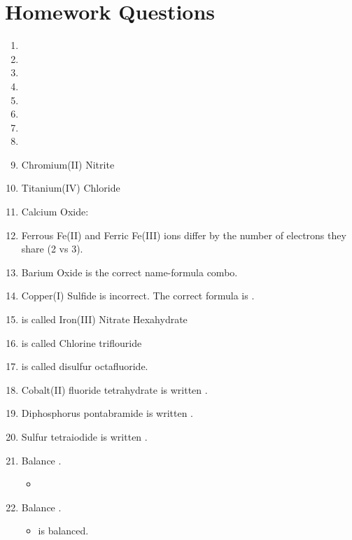 \documentclass[11pt, letterpaper]{article}
\begin{document}
\section*{Homework Questions}
\begin{enumerate}
	\item {}
	\item {}
	\item {}
	\item {}
	\item {}
	\item {}
	\item {}
	\item {}
	\item Chromium(II) Nitrite 
	\item Titanium(IV) Chloride 
	\item Calcium Oxide: 
	\item Ferrous Fe(II) and Ferric Fe(III) ions differ by the number of electrons they share (2 vs 3).
	\item Barium Oxide  is the correct name-formula combo.
	\item Copper(I) Sulfide  is incorrect. The correct formula is .
	\item {} is called Iron(III) Nitrate Hexahydrate
	\item {} is called Chlorine triflouride
	\item {} is called disulfur octafluoride.
	\item Cobalt(II) fluoride tetrahydrate is written .
	\item Diphosphorus pontabramide is written .
	\item Sulfur tetraiodide is written .
	\item Balance .
		\begin{itemize}
			\item {}
		\end{itemize}
	\item Balance .
		\begin{itemize}
			\item {} is balanced.
		\end{itemize}

\end{enumerate}
\end{document}
